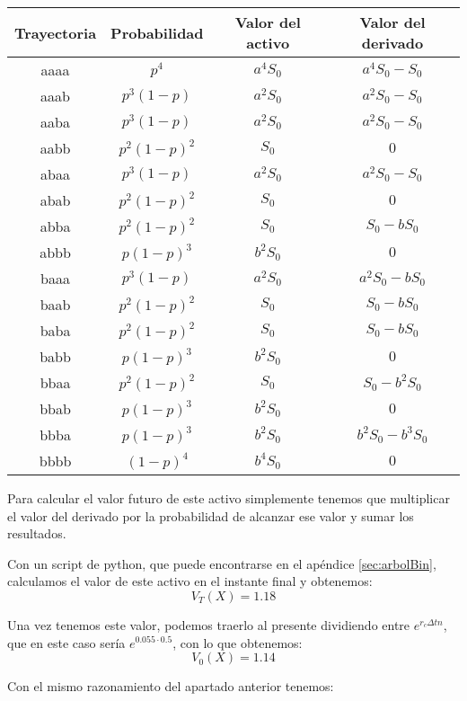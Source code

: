 \begin{problem}[1]
\begin{center}
\begin{tabular}{|c|c|c|c|}
\hline
\textbf{Trayectoria} & \textbf{Probabilidad} & \textbf{Valor del activo} & \textbf{Valor del derivado}\\
\hline
aaaa & $p^4$        & $a^4S_0$ & $a^4S_0-S_0$ \\
aaab & $p^3(1-p)$   & $a^2S_0$ & $a^2S_0-S_0$ \\
aaba & $p^3(1-p)$   & $a^2S_0$ & $a^2S_0-S_0$ \\
aabb & $p^2(1-p)^2$ & $S_0$ & $0$ \\
abaa & $p^3(1-p)$   & $a^2S_0$ & $a^2S_0-S_0$ \\
abab & $p^2(1-p)^2$ & $S_0$ & $0$ \\
abba & $p^2(1-p)^2$ & $S_0$ & $S_0-bS_0$ \\
abbb & $p(1-p)^3$   & $b^2S_0$ & $0$ \\
baaa & $p^3(1-p)$   & $a^2S_0$ & $a^2S_0-bS_0$ \\
baab & $p^2(1-p)^2$ & $S_0$ & $S_0-bS_0$ \\
baba & $p^2(1-p)^2$ & $S_0$ & $S_0-bS_0$ \\
babb & $p(1-p)^3$   & $b^2S_0$ & $0$ \\
bbaa & $p^2(1-p)^2$ & $S_0$ & $S_0-b^2S_0$ \\
bbab & $p(1-p)^3$   & $b^2S_0$ & $0$ \\
bbba & $p(1-p)^3$   & $b^2S_0$ & $b^2S_0-b^3S_0$ \\
bbbb & $(1-p)^4$    & $b^4S_0$ & $0$ \\
\hline
\end{tabular}
\end{center}

Para calcular el valor futuro de este activo simplemente tenemos que multiplicar el valor del derivado por la probabilidad de alcanzar ese valor y sumar los resultados.

Con un script de python, que puede encontrarse en el apéndice \ref{sec:arbolBin}, calculamos el valor de este activo en el instante final y obtenemos:
\[V_T(X) = 1.18\]

Una vez tenemos este valor, podemos traerlo al presente dividiendo entre $e^{r_cΔtn}$, que en este caso sería $e^{0.055\cdot 0.5}$, con lo que obtenemos:
\[V_0(X) = 1.14\]

\spart

Con el mismo razonamiento del apartado anterior tenemos:


\end{problem}
